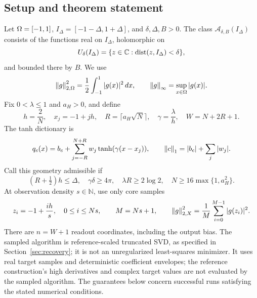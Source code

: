 \subsection{Setup and theorem statement}
\label{sec:setup}
Let $\Omega=[-1,1]$, $I_\Delta=[-1-\Delta,1+\Delta]$, and $\delta,\Delta,B>0$.
The class $\mathcal A_{\delta,B}(I_\Delta)$ consists of the functions real on
$I_\Delta$, holomorphic on
\[
 U_\delta(I_\Delta)=\{z\in\mathbb C:\operatorname{dist}(z,I_\Delta)<\delta\},
\]
and bounded there by $B$. We use
\[
 \left\lVert g\right\rVert_{2,\Omega}^2=\frac12\int_{-1}^1|g(x)|^2\,dx,
 \qquad \left\lVert g\right\rVert_\infty=\sup_{x\in\Omega}|g(x)|.
\]
Fix $0<\lambda\le1$ and $a_H>0$, and define
\begin{equation}
 h=\frac2N,\quad x_j=-1+jh,\quad
 R=\lceil a_H\sqrt N\rceil,\quad \gamma=\frac\lambda h,
 \quad W=N+2R+1.
 \label{eq:geometry}
\end{equation}
The tanh dictionary is
\begin{equation}
 q_c(x)=b_c+\sum_{j=-R}^{N+R}w_j\tanh(\gamma(x-x_j)),
 \qquad \left\lVert c\right\rVert_1=|b_c|+\sum_j|w_j|.
 \label{eq:dictionary}
\end{equation}
Call this geometry admissible if
\begin{equation}
 (R+\tfrac12)h\le\Delta,\quad \gamma\delta\ge4\pi,
 \quad \lambda R\ge2\log2,\quad
 N\ge16\max\{1,a_H^2\}.
 \label{eq:admissible}
\end{equation}
At observation density $s\in\mathbb N$, use only core samples
\begin{equation}
 z_i=-1+\frac{ih}{s},\quad 0\le i\le Ns,
 \qquad M=Ns+1,\qquad
 \left\lVert g\right\rVert_{2,X}^2=\frac1M\sum_{i=0}^{M-1}|g(z_i)|^2.
 \label{eq:samplegrid}
\end{equation}
There are $n=W+1$ readout coordinates, including the output bias. The sampled
algorithm is reference-scaled truncated SVD, as specified in
Section~\ref{sec:recovery}; it is not an unregularized least-squares minimizer.
It uses real target samples and deterministic coefficient envelopes; the
reference construction's high derivatives and complex target values are not
evaluated by the sampled algorithm. The guarantees below concern successful
runs satisfying the stated numerical conditions.


